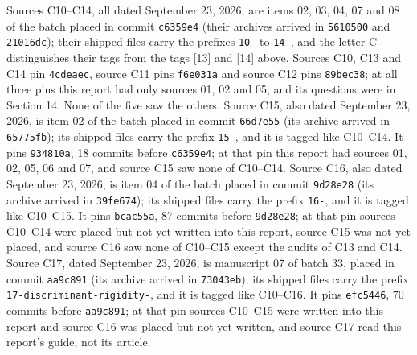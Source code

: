 \documentclass[11pt,oneside]{article}
\numberwithin{equation}{section}
\theoremstyle{definition}
\theoremstyle{remark}
\newcommand{\src}[1]{\textup{\textsf{\small[#1]}}}
\newcommand{\fn}[1]{\nolinkurl{#1}}
\begin{document}
Sources C10--C14, all dated September 23, 2026, are items 02, 03, 04, 07 and 08
of the batch placed in commit \texttt{c6359e4} (their archives arrived in
\texttt{5610500} and \texttt{21016dc}); their shipped files carry the prefixes
\fn{10-} to \fn{14-}, and the letter C distinguishes their tags from the tags
\src{13} and \src{14} above. Sources C10, C13 and C14 pin \texttt{4cdeaec}, source
C11 pins \texttt{f6e031a} and source C12 pins \texttt{89bec38}; at all three pins
this report had only sources 01, 02 and 05, and its questions were in Section 14.
None of the five saw the others. Source C15, also dated September 23, 2026, is item 02
of the batch placed in commit \texttt{66d7e55} (its archive arrived in \texttt{65775fb});
its shipped files carry the prefix \fn{15-}, and it is tagged like C10--C14. It pins
\texttt{934810a}, 18 commits before \texttt{c6359e4}; at that pin this report had
sources 01, 02, 05, 06 and 07, and source C15 saw none of C10--C14. Source C16, also dated
September 23, 2026, is item 04 of the batch placed in commit \texttt{9d28e28} (its archive
arrived in \texttt{39fe674}); its shipped files carry the prefix \fn{16-}, and it is tagged
like C10--C15. It pins \texttt{bcac55a}, 87 commits before \texttt{9d28e28}; at that pin
sources C10--C14 were placed but not yet written into this report, source C15 was not yet
placed, and source C16 saw none of C10--C15 except the audits of C13 and C14.
Source C17, dated September 23, 2026, is manuscript 07 of batch 33, placed in commit
\texttt{aa9c891} (its archive arrived in \texttt{73043eb}); its shipped files carry the
prefix \fn{17-discriminant-rigidity-}, and it is tagged like C10--C16. It pins
\texttt{efc5446}, 70 commits before \texttt{aa9c891}; at that pin sources C10--C15 were
written into this report and source C16 was placed but not yet written, and source C17 read
this report's guide, not its article.
\end{document}
